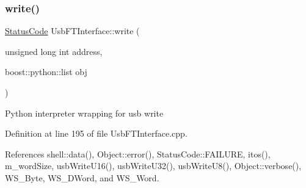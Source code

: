 \mbox{\label{classUsbFTInterface_a2efbde3a31cdbe44a3cbd66da6592870}} 
\subsubsection{\texorpdfstring{write()}{write()}\hspace{0.1cm}{\footnotesize\ttfamily [2/2]}}
{\footnotesize\ttfamily \hyperlink{classStatusCode}{Status\+Code} Usb\+F\+T\+Interface\+::write (\begin{DoxyParamCaption}\item[{unsigned long int}]{address,  }\item[{boost\+::python\+::list}]{obj }\end{DoxyParamCaption})}

Python interpreter wrapping for usb write 

Definition at line 195 of file Usb\+F\+T\+Interface.\+cpp.



References shell\+::data(), Object\+::error(), Status\+Code\+::\+F\+A\+I\+L\+U\+RE, itos(), m\+\_\+word\+Size, usb\+Write\+U16(), usb\+Write\+U32(), usb\+Write\+U8(), Object\+::verbose(), W\+S\+\_\+\+Byte, W\+S\+\_\+\+D\+Word, and W\+S\+\_\+\+Word.



